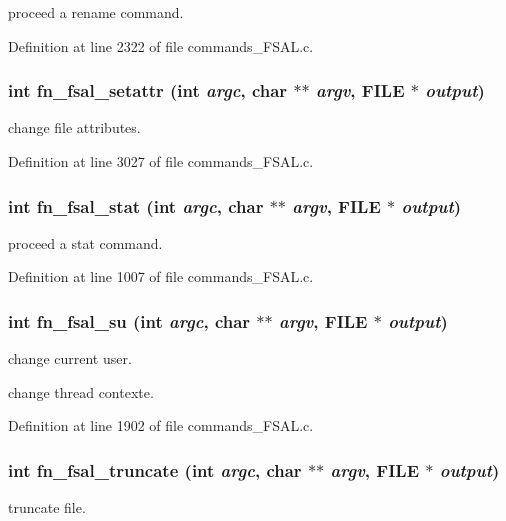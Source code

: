 proceed a rename command. 

Definition at line 2322 of file commands\_\-FSAL.c.
\subsubsection[{fn\_\-fsal\_\-setattr}]{\setlength{\rightskip}{0pt plus 5cm}int fn\_\-fsal\_\-setattr (int {\em argc}, \/  char $\ast$$\ast$ {\em argv}, \/  FILE $\ast$ {\em output})}\label{commands_8h_a64ebfd92fc63b2660ade0d2986941ad0}
change file attributes. 

Definition at line 3027 of file commands\_\-FSAL.c.
\subsubsection[{fn\_\-fsal\_\-stat}]{\setlength{\rightskip}{0pt plus 5cm}int fn\_\-fsal\_\-stat (int {\em argc}, \/  char $\ast$$\ast$ {\em argv}, \/  FILE $\ast$ {\em output})}\label{commands_8h_ae507243945bd2b2378eaaa4b9ad07406}
proceed a stat command. 

Definition at line 1007 of file commands\_\-FSAL.c.
\subsubsection[{fn\_\-fsal\_\-su}]{\setlength{\rightskip}{0pt plus 5cm}int fn\_\-fsal\_\-su (int {\em argc}, \/  char $\ast$$\ast$ {\em argv}, \/  FILE $\ast$ {\em output})}\label{commands_8h_a8b60c5a24b06782c3a35897b0e4de143}
change current user.

change thread contexte. 

Definition at line 1902 of file commands\_\-FSAL.c.
\subsubsection[{fn\_\-fsal\_\-truncate}]{\setlength{\rightskip}{0pt plus 5cm}int fn\_\-fsal\_\-truncate (int {\em argc}, \/  char $\ast$$\ast$ {\em argv}, \/  FILE $\ast$ {\em output})}\label{commands_8h_ad1e4eaf9bc2a2c768edee9550533f8fc}
truncate file.

